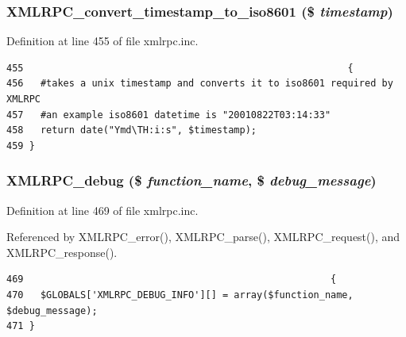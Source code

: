 \hypertarget{xmlrpc_8inc_4485d809c5d598949d9cfaca42bddf37}{
\subsubsection{\setlength{\rightskip}{0pt plus 5cm}XMLRPC\_\-convert\_\-timestamp\_\-to\_\-iso8601 (\$ {\em timestamp})}}
\label{xmlrpc_8inc_4485d809c5d598949d9cfaca42bddf37}




Definition at line 455 of file xmlrpc.inc.

\begin{Code}\begin{verbatim}455                                                         {
456   #takes a unix timestamp and converts it to iso8601 required by XMLRPC
457   #an example iso8601 datetime is "20010822T03:14:33"
458   return date("Ymd\TH:i:s", $timestamp);
459 }
\end{verbatim}
\end{Code}


\hypertarget{xmlrpc_8inc_e2d2e97a8c1c560f5e96d58d60a02874}{
\subsubsection{\setlength{\rightskip}{0pt plus 5cm}XMLRPC\_\-debug (\$ {\em function\_\-name}, \$ {\em debug\_\-message})}}
\label{xmlrpc_8inc_e2d2e97a8c1c560f5e96d58d60a02874}




Definition at line 469 of file xmlrpc.inc.

Referenced by XMLRPC\_\-error(), XMLRPC\_\-parse(), XMLRPC\_\-request(), and XMLRPC\_\-response().

\begin{Code}\begin{verbatim}469                                                      {
470   $GLOBALS['XMLRPC_DEBUG_INFO'][] = array($function_name, $debug_message);
471 }
\end{verbatim}
\end{Code}




